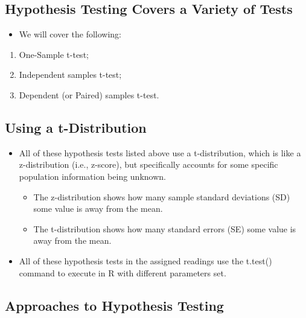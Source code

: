 \documentclass[
  letterpaper,
  DIV=11,
  numbers=noendperiod]{scrreprt}
\providecommand{\tightlist}{%
  \setlength{\itemsep}{0pt}\setlength{\parskip}{0pt}}\usepackage{longtable,booktabs,array}
\begin{document}
\subsection{Hypothesis Testing Covers a Variety of
Tests}\label{hypothesis-testing-covers-a-variety-of-tests}

\begin{itemize}
\tightlist
\item
  We will cover the following:
\end{itemize}

\begin{enumerate}
\def\labelenumi{\arabic{enumi}.}
\tightlist
\item
  One-Sample t-test;
\item
  Independent samples t-test;
\item
  Dependent (or Paired) samples t-test.
\end{enumerate}

\subsection{Using a t-Distribution}\label{using-a-t-distribution}

\begin{itemize}
\tightlist
\item
  All of these hypothesis tests listed above use a t-distribution, which
  is like a z-distribution (i.e., z-score), but specifically accounts
  for some specific population information being unknown.

  \begin{itemize}
  \tightlist
  \item
    The z-distribution shows how many sample standard deviations (SD)
    some value is away from the mean.
  \item
    The t-distribution shows how many standard errors (SE) some value is
    away from the mean.
  \end{itemize}
\item
  All of these hypothesis tests in the assigned readings use the
  t.test() command to execute in R with different parameters set.
\end{itemize}

\subsection{Approaches to Hypothesis
Testing}\label{approaches-to-hypothesis-testing}
\end{document}
